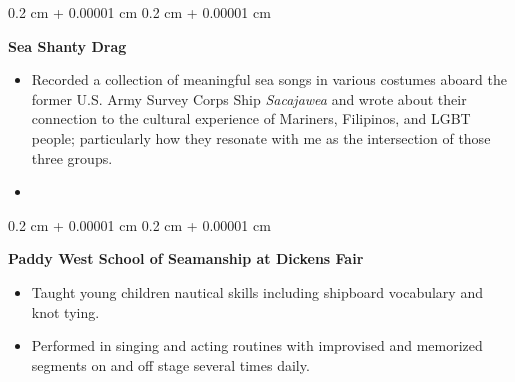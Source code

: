 \documentclass[10pt, letterpaper]{article}
\newenvironment{highlights}{
    \begin{itemize}[
        topsep=0.10 cm,
        parsep=0.10 cm,
        partopsep=0pt,
        itemsep=0pt,
        leftmargin=0.4 cm + 10pt
    ]
}{
    \end{itemize}
} %
\newenvironment{onecolentry}{
    \begin{adjustwidth}{
        0.2 cm + 0.00001 cm
    }{
        0.2 cm + 0.00001 cm
    }
}{
    \end{adjustwidth}
} %
\newenvironment{twocolentry}[2][]{
    \onecolentry
    \def\secondColumn{#2}
    \setcolumnwidth{\fill, 4.5 cm}
    \begin{paracol}{2}
}{
    \switchcolumn \raggedleft \secondColumn
    \end{paracol}
    \endonecolentry
} %
\let\hrefWithoutArrow\href
\renewcommand{\href}[2]{\hrefWithoutArrow{#1}{\mbox{\ifthenelse{\equal{#2}{}}{ }{#2 }\raisebox{.15ex}{\footnotesize \faExternalLink*}}}}
\begin{document}
        \vspace{0.2 cm}

        \begin{twocolentry}{
            2023
        }
            \textbf{Sea Shanty Drag}
            \begin{highlights}
                \item Recorded a collection of meaningful sea songs in various costumes aboard the former U.S. Army Survey Corps Ship \textit{Sacajawea} and wrote about their connection to the cultural experience of Mariners, Filipinos, and LGBT people; particularly how they resonate with me as the intersection of those three groups.
                \item \href{https://www.youtube.com/watch?v=oUYFaghc-xI}{Video}
            \end{highlights}
        \end{twocolentry}


        \vspace{0.2 cm}

        \begin{onecolentry}
            \textbf{Paddy West School of Seamanship at Dickens Fair}
            \begin{highlights}
                \item Taught young children nautical skills including shipboard vocabulary and knot tying.
                \item Performed in singing and acting routines with improvised and memorized segments on and off stage several times daily.
            \end{highlights}
        \end{onecolentry}



    
\end{document}
